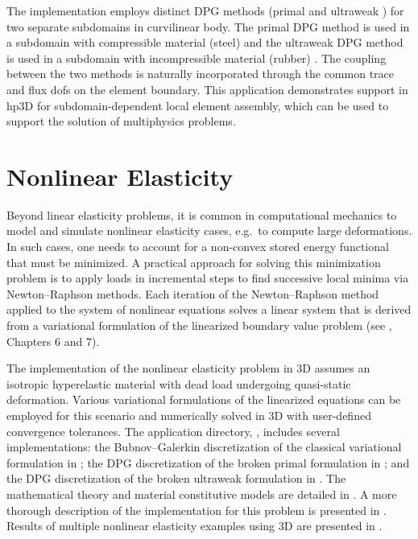 The implementation employs distinct DPG methods (primal and ultraweak \cite{keith2016elasticity}) for two separate subdomains in curvilinear body. The primal DPG method is used in a subdomain with compressible material (steel) and the ultraweak DPG method is used in a subdomain with incompressible material (rubber) \cite{fuentes2017coupled}. The coupling between the two methods is naturally incorporated through the common trace and flux dofs on the element boundary. This application demonstrates support in hp3D for subdomain-dependent local element assembly, which can be used to support the solution of multiphysics problems.

\section{Nonlinear Elasticity}
\label{sec:nonlinear-elasticity}

Beyond linear elasticity problems, it is common in computational mechanics to model and simulate nonlinear elasticity cases, e.g.~to compute large deformations. In such cases, one needs to account for a non-convex stored energy functional that must be minimized. A practical approach for solving this minimization problem is to apply loads in incremental steps to find successive local minima via Newton--Raphson methods. Each iteration of the Newton--Raphson method applied to the system of nonlinear equations solves a linear system that is derived from a variational formulation of the linearized boundary value problem (see \cite{mora2020polydpg}, Chapters 6 and 7). 

The implementation of the nonlinear elasticity problem in \hp3D assumes an isotropic hyperelastic material with dead load undergoing quasi-static deformation. Various variational formulations of the linearized equations can be employed for this scenario and numerically solved in \hp3D with user-defined convergence tolerances. The application directory, , includes several implementations: the Bubnov--Galerkin discretization of the classical variational formulation in ; the DPG discretization of the broken primal formulation in ; and the DPG discretization of the broken ultraweak formulation in . The mathematical theory and material constitutive models are detailed in \cite{mora2020polydpg}. A more thorough description of the implementation for this problem is presented in  \cite{hpbook3}. Results of multiple nonlinear elasticity examples using \hp3D are presented in \cite{hpbook3,mora2022polyhedral}.

